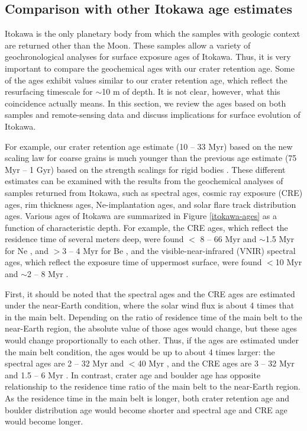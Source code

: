 \documentclass[3p,authoryear]{elsarticle}
\begin{document}
\subsection{Comparison with other Itokawa age estimates}\label{sec:itokawa-sample}
Itokawa is the only planetary body from which the samples with geologic context are returned other than the Moon. These samples allow a variety of geochronological analyses for surface exposure ages of Itokawa. Thus, it is very important to compare the geochemical ages with our crater retention age. Some of the ages exhibit values similar to our crater retention age, which reflect the resurfacing timescale for $\sim$10 m of depth. It is not clear, however, what this coincidence actually means. In this section, we review the ages based on both samples and remote-sensing data and discuss implications for surface evolution of Itokawa.

For example, our crater retention age estimate (10 -- 33 Myr) based on the new scaling law for coarse grains is much younger than the previous age estimate (75 Myr -- 1 Gyr) based on the strength scalings for rigid bodies \citep{michel2009}. 
These different estimates can be examined with the results from the geochemical analyses of samples returned from Itokawa, such as spectral ages, cosmic ray exposure (CRE) ages, rim thickness ages, Ne-implantation ages, and solar flare track distribution ages. Various ages of Itokawa are summarized in Figure \ref{itokawa-ages} as a function of characteristic depth. For example, the CRE ages, which reflect the residence time of several meters deep, were found $<$ 8 -- 66 Myr \citep{nagao2011} and $\sim$1.5 Myr for Ne \citep{meier2014}, and $>$3 -- 4 Myr for Be \citep{nishiizumi2015}, and the visible-near-infrared (VNIR) spectral ages, which reflect the exposure time of uppermost surface, were found $<$10 Myr \citep{koga2014} and $\sim$2 -- 8 Myr \citep{bonal2015}.

First, it should be noted that the spectral ages and the CRE ages are estimated under the near-Earth condition, where the solar wind flux is about 4 times that in the main belt. Depending on the ratio of residence time of the main belt to the near-Earth region, the absolute value of those ages would change, but these ages would change proportionally to each other. Thus, if the ages are estimated under the main belt condition, the ages would be up to about 4 times larger: the spectral ages are 2 -- 32 Myr \citep{bonal2015} and $<$40 Myr \citep{koga2014}, and the CRE ages are 3 -- 32 Myr \citep{nagao2011} and 1.5 -- 6 Myr \citep{meier2014}.
In contrast, crater age and boulder age has opposite relationship to the residence time ratio of the main belt to the near-Earth region. As the residence time in the main belt is longer, both crater retention age and boulder distribution age would become shorter and spectral age and CRE age would become longer.
\end{document}
